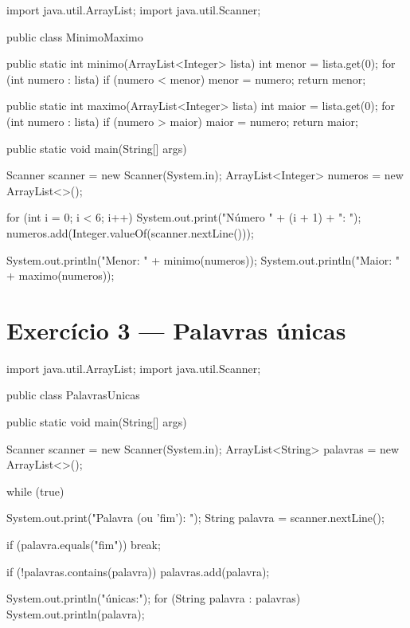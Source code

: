 \documentclass[11pt,a4paper]{article}
\begin{document}
\begin{javacode}
import java.util.ArrayList;
import java.util.Scanner;

public class MinimoMaximo {

    public static int minimo(ArrayList<Integer> lista) {
        int menor = lista.get(0);
        for (int numero : lista) {
            if (numero < menor) {
                menor = numero;
            }
        }
        return menor;
    }

    public static int maximo(ArrayList<Integer> lista) {
        int maior = lista.get(0);
        for (int numero : lista) {
            if (numero > maior) {
                maior = numero;
            }
        }
        return maior;
    }

    public static void main(String[] args) {
        Scanner scanner = new Scanner(System.in);
        ArrayList<Integer> numeros = new ArrayList<>();

        for (int i = 0; i < 6; i++) {
            System.out.print("Número " + (i + 1) + ": ");
            numeros.add(Integer.valueOf(scanner.nextLine()));
        }

        System.out.println("Menor: " + minimo(numeros));
        System.out.println("Maior: " + maximo(numeros));
    }
}
\end{javacode}

\section{Exercício 3 --- Palavras únicas}

\begin{javacode}
import java.util.ArrayList;
import java.util.Scanner;

public class PalavrasUnicas {
    public static void main(String[] args) {
        Scanner scanner = new Scanner(System.in);
        ArrayList<String> palavras = new ArrayList<>();

        while (true) {
            System.out.print("Palavra (ou 'fim'): ");
            String palavra = scanner.nextLine();

            if (palavra.equals("fim")) {
                break;
            }

            if (!palavras.contains(palavra)) {
                palavras.add(palavra);
            }
        }

        System.out.println("\nPalavras únicas:");
        for (String palavra : palavras) {
            System.out.println(palavra);
        }
    }
}
\end{javacode}
\end{document}
